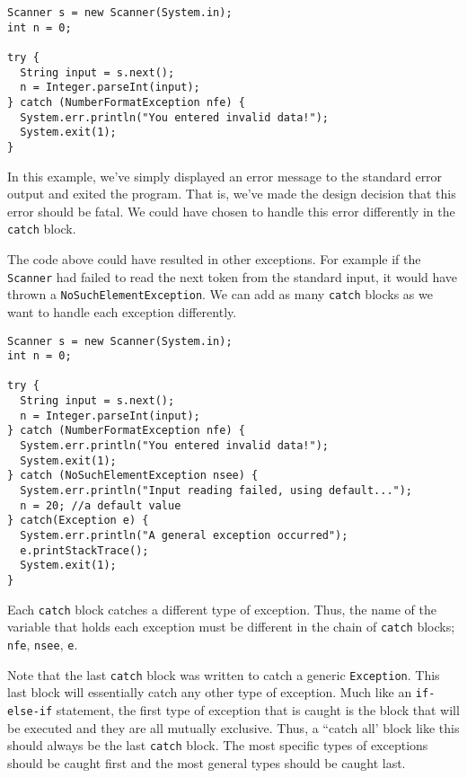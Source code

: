 \begin{verbatim}
Scanner s = new Scanner(System.in);
int n = 0;
		
try {
  String input = s.next();
  n = Integer.parseInt(input);
} catch (NumberFormatException nfe) {
  System.err.println("You entered invalid data!");
  System.exit(1);
}
\end{verbatim}

In this example, we've simply displayed an error message to
the standard error output and exited the program.  That is, 
we've made the design decision that this error should be fatal.
We could have chosen to handle this error differently in the
\texttt{catch} block.

The code above could have resulted in other exceptions.  For
example if the \texttt{Scanner} had failed to read the
next token from the standard input, it would have thrown a
\texttt{NoSuchElementException}.  We can add
as many \texttt{catch} blocks as we want to handle
each exception differently.

\begin{verbatim}
Scanner s = new Scanner(System.in);
int n = 0;
		
try {
  String input = s.next();
  n = Integer.parseInt(input);
} catch (NumberFormatException nfe) {
  System.err.println("You entered invalid data!");
  System.exit(1);
} catch (NoSuchElementException nsee) {
  System.err.println("Input reading failed, using default...");
  n = 20; //a default value
} catch(Exception e) {
  System.err.println("A general exception occurred");
  e.printStackTrace();
  System.exit(1);
}
\end{verbatim}

Each \texttt{catch} block catches a different 
type of exception.  Thus, the name of the variable
that holds each exception must be different in the chain
of \texttt{catch} blocks; \texttt{nfe}, 
\texttt{nsee}, \texttt{e}.

Note that the last \texttt{catch} block was written
to catch a generic \texttt{Exception}.  This last
block will essentially catch any other type of exception.  
Much like an \texttt{if-else-if} statement, the
first type of exception that is caught is the block that will
be executed and they are all mutually exclusive.  Thus, a
``catch all' block like this should always be the last 
\texttt{catch} block.  The most specific types
of exceptions should be caught first and the most general
types should be caught last.

